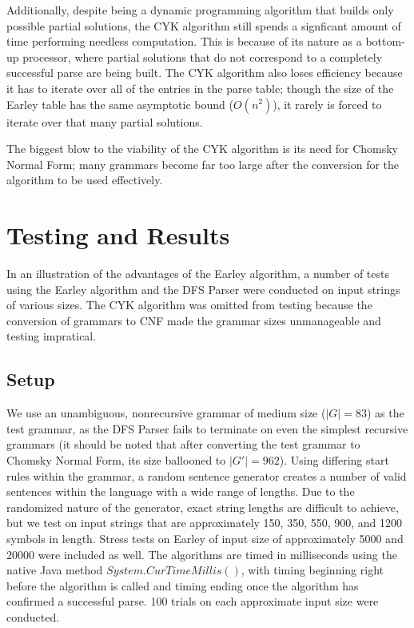\documentclass[a4paper, 11pt]{article}
\begin{document}
Additionally, despite being a dynamic programming algorithm that builds only possible partial solutions, the CYK algorithm still spends a signficant amount of time 
performing needless computation. This is because of its nature as a bottom-up processor, where partial solutions that do not correspond to a completely successful parse are being built. The CYK algorithm also loses efficiency because it has to iterate over all of the entries in the parse table; though the size of the Earley table has the same 
asymptotic bound ($O(n^2)$), it rarely is forced to iterate over that many partial solutions.

The biggest blow to the viability of the CYK algorithm is its need for Chomsky Normal Form; many grammars become far too large after the conversion for the algorithm to be 
used effectively.

\section{Testing and Results}

In an illustration of the advantages of the Earley algorithm, a number of tests using the Earley algorithm and the DFS Parser were conducted on input strings of various 
sizes. The CYK algorithm was omitted from testing because the conversion of grammars to CNF made the grammar sizes unmanageable and testing impratical.

\subsection{Setup}
We use an unambiguous, nonrecursive grammar of medium size ($|G| = 83$) as the test grammar, as the DFS Parser fails to terminate on even the simplest recursive grammars (it
should be noted that after converting the test grammar to Chomsky Normal Form, its size ballooned to $|G'| = 962$).
Using differing start rules within the grammar, a random sentence generator creates a number of valid sentences within the language with a wide range of lengths.
Due to the randomized nature of the generator, exact string lengths are difficult to achieve, but we test on input strings that are approximately 150, 350, 550, 900, and 1200
symbols in length. Stress tests on Earley of input size of approximately 5000 and 20000 were included as well.
The algorithms are timed in milliseconds using the native Java method $System.CurTimeMillis()$, with timing beginning right before the algorithm is called 
and timing ending once the algorithm has confirmed a successful parse. 100 trials on each approximate input size were conducted.
\end{document}

